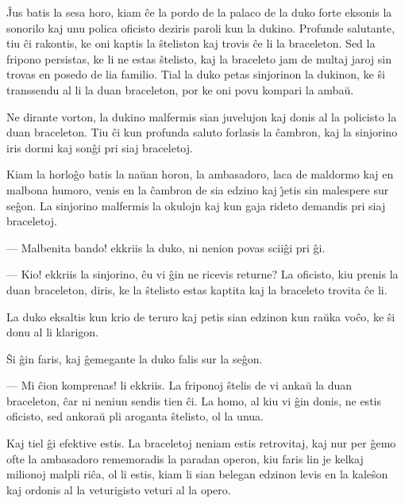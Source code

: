    \^Jus batis la sesa horo, kiam \^ce la pordo de la palaco de la duko
forte eksonis la sonorilo kaj unu polica oficisto deziris paroli kun
la dukino. Profunde salutante, tiu \^ci rakontis, ke oni kaptis la
\^steliston kaj trovis \^ce li la braceleton. Sed la fripono
persistas, ke li ne estas \^stelisto, kaj la braceleto jam de multaj
jaroj sin trovas en posedo de lia familio. Tial la duko petas
sinjorinon la dukinon, ke \^si transsendu al li la duan braceleton,
por ke oni povu kompari la amba\u u.

   Ne dirante vorton, la dukino malfermis sian juvelujon kaj donis al la
policisto la duan braceleton. Tiu \^ci kun profunda saluto forlasis
la \^cambron, kaj la sinjorino iris dormi kaj son\^gi pri siaj
braceletoj.

   Kiam la horlo\^go batis la na\u uan horon, la ambasadoro, laca de
maldormo kaj en malbona humoro, venis en la \^cambron de sia edzino
kaj \^{\j}etis sin malespere sur se\^gon. La sinjorino malfermis la
okulojn kaj kun gaja rideto demandis pri siaj braceletoj.

 --- Malbenita bando! ekkriis la duko, ni nenion povas scii\^gi pri \^gi.

 --- Kio! ekkriis la sinjorino, \^cu vi \^gin ne ricevis returne? La
oficisto, kiu prenis la duan braceleton, diris, ke la \^stelisto
estas kaptita kaj la braceleto trovita \^ce li.

   La duko eksaltis kun krio de teruro kaj petis sian edzinon kun ra\u uka
vo\^co, ke \^si donu al li klarigon.

   \^Si \^gin faris, kaj \^gemegante la duko falis sur la se\^gon.

 --- Mi \^cion komprenas! li ekkriis. La friponoj \^stelis de vi anka\u u
la duan braceleton, \^car ni neniun sendis tien \^ci. La homo, al
kiu vi \^gin donis, ne estis oficisto, sed ankora\u u pli aroganta
\^stelisto, ol la unua.

\enlargethispage{-\baselineskip}

   Kaj tiel \^gi efektive estis. La braceletoj neniam estis retrovitaj,
kaj nur per \^gemo ofte la ambasadoro rememoradis la paradan operon,
kiu faris lin je kelkaj milionoj malpli ri\^ca, ol li estis, kiam li
sian belegan edzinon levis en la kale\^son kaj ordonis al la
veturigisto veturi al la opero.

\smallrule{}
